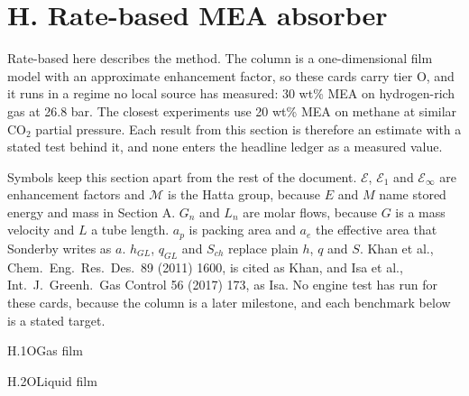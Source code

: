 \section{H. Rate-based MEA absorber}\label{sec:H}
Rate-based here describes the method. The column is a one-dimensional film model with an approximate enhancement factor, so these cards carry tier O, and it runs in a regime no local source has measured: 30 wt\% MEA on hydrogen-rich gas at 26.8 bar. The closest experiments use 20 wt\% MEA on methane at similar CO$_2$ partial pressure. Each result from this section is therefore an estimate with a stated test behind it, and none enters the headline ledger as a measured value.

Symbols keep this section apart from the rest of the document. $\mathcal E$, $\mathcal E_1$ and $\mathcal E_\infty$ are enhancement factors and $\mathcal M$ is the Hatta group, because $E$ and $M$ name stored energy and mass in Section A. $G_n$ and $L_n$ are molar flows, because $G$ is a mass velocity and $L$ a tube length. $a_p$ is packing area and $a_e$ the effective area that Sonderby writes as $a$. $h_{GL}$, $q_{GL}$ and $S_{ch}$ replace plain $h$, $q$ and $S$. Khan et al., Chem.\ Eng.\ Res.\ Des.\ 89 (2011) 1600, is cited as Khan, and Isa et al., Int.\ J.\ Greenh.\ Gas Control 56 (2017) 173, as Isa. No engine test has run for these cards, because the column is a later milestone, and each benchmark below is a stated target.

\begin{eqcard}{H.1}{O}{Gas film}
\end{eqcard}

\begin{eqcard}{H.2}{O}{Liquid film}
\end{eqcard}

